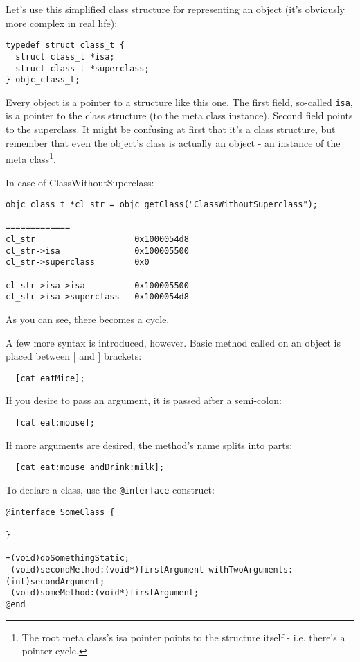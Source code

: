 \documentclass[a4paper, 11pt, fleqn]{book}
\begin{document}
Let's use this simplified class structure for representing an object (it's obviously more complex in real life):

\begin{verbatim}
typedef struct class_t {
  struct class_t *isa;
  struct class_t *superclass;
} objc_class_t;
\end{verbatim}

Every object is a pointer to a structure like this one. The first field, so-called \verb=isa=, is a pointer to the class structure (to the meta class instance). Second field points to the superclass. It might be confusing at first that it's a class structure, but remember that even the object's class is actually an object - an instance of the meta class\footnote{The root meta class's isa pointer points to the structure itself - i.e. there's a pointer cycle.}.

In case of ClassWithoutSuperclass:

\begin{verbatim}
objc_class_t *cl_str = objc_getClass("ClassWithoutSuperclass");

=============
cl_str                    0x1000054d8
cl_str->isa               0x100005500
cl_str->superclass        0x0

cl_str->isa->isa          0x100005500
cl_str->isa->superclass   0x1000054d8
\end{verbatim}

As you can see, there becomes a cycle.

A few more syntax is introduced, however. Basic method called on an object is placed between [ and ] brackets:

\begin{verbatim}
  [cat eatMice];
\end{verbatim}

If you desire to pass an argument, it is passed after a semi-colon:

\begin{verbatim}
  [cat eat:mouse];
\end{verbatim}

If more arguments are desired, the method's name splits into parts:

\begin{verbatim}
  [cat eat:mouse andDrink:milk];
\end{verbatim}

To declare a class, use the \verb=@interface= construct:

\begin{verbatim}
@interface SomeClass {

}

+(void)doSomethingStatic;
-(void)secondMethod:(void*)firstArgument withTwoArguments:(int)secondArgument;
-(void)someMethod:(void*)firstArgument;
@end

\end{verbatim}
\end{document}
